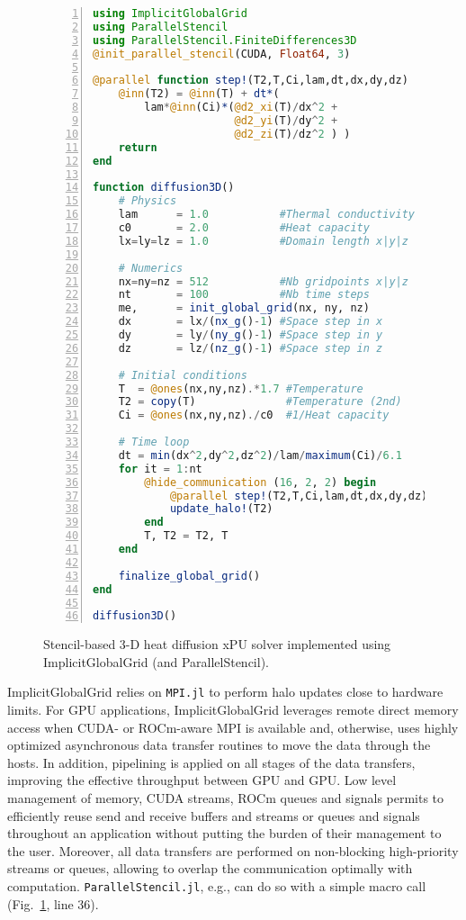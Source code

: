 \documentclass{juliacon}
\begin{document}
\begin{figure}[t]
\begin{lstlisting}[language = Julia, numbers=left, numberstyle=\tiny\color{gray}]
using ImplicitGlobalGrid
using ParallelStencil
using ParallelStencil.FiniteDifferences3D
@init_parallel_stencil(CUDA, Float64, 3)

@parallel function step!(T2,T,Ci,lam,dt,dx,dy,dz)
    @inn(T2) = @inn(T) + dt*(
        lam*@inn(Ci)*(@d2_xi(T)/dx^2 + 
                      @d2_yi(T)/dy^2 + 
                      @d2_zi(T)/dz^2 ) )
    return
end

function diffusion3D()
    # Physics
    lam      = 1.0           #Thermal conductivity
    c0       = 2.0           #Heat capacity
    lx=ly=lz = 1.0           #Domain length x|y|z

    # Numerics
    nx=ny=nz = 512           #Nb gridpoints x|y|z
    nt       = 100           #Nb time steps
    me,      = init_global_grid(nx, ny, nz)
    dx       = lx/(nx_g()-1) #Space step in x
    dy       = ly/(ny_g()-1) #Space step in y
    dz       = lz/(nz_g()-1) #Space step in z

    # Initial conditions
    T  = @ones(nx,ny,nz).*1.7 #Temperature
    T2 = copy(T)              #Temperature (2nd)
    Ci = @ones(nx,ny,nz)./c0  #1/Heat capacity

    # Time loop
    dt = min(dx^2,dy^2,dz^2)/lam/maximum(Ci)/6.1
    for it = 1:nt
        @hide_communication (16, 2, 2) begin
            @parallel step!(T2,T,Ci,lam,dt,dx,dy,dz)
            update_halo!(T2)
        end
        T, T2 = T2, T
    end

    finalize_global_grid()
end

diffusion3D()

\end{lstlisting}

    \caption{Stencil-based 3-D heat diffusion xPU solver implemented using ImplicitGlobalGrid (and ParallelStencil).}
	\label{fig:code}
\end{figure}


ImplicitGlobalGrid relies on \texttt{MPI.jl} \cite{byrne2021mpi} to perform halo updates close to hardware limits. For GPU applications, ImplicitGlobalGrid leverages remote direct memory access when CUDA- or ROCm-aware MPI is available and, otherwise, uses highly optimized asynchronous data transfer routines to move the data through the hosts. In addition, pipelining is applied on all stages of the data transfers, improving the effective throughput between GPU and GPU. Low level management of memory, CUDA streams, ROCm queues and signals permits to efficiently reuse send and receive buffers and streams or queues and signals throughout an application without putting the burden of their management to the user. Moreover, all data transfers are performed on non-blocking high-priority streams or queues, allowing to overlap the communication optimally with computation. \texttt{ParallelStencil.jl}, e.g., can do so with a simple macro call (Fig.~\ref{fig:code}, line 36).
\end{document}
